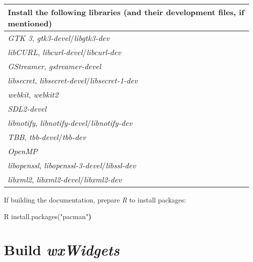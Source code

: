 \documentclass[
  letterpaper,
]{LegrandOrangeBook}
\newenvironment{Shaded}{\begin{snugshade}}{\end{snugshade}}
\newcommand{\ErrorTok}[1]{\textcolor[rgb]{0.68,0.00,0.00}{#1}}
\newcommand{\ExtensionTok}[1]{\textcolor[rgb]{0.00,0.23,0.31}{#1}}
\newcommand{\KeywordTok}[1]{\textcolor[rgb]{0.00,0.23,0.31}{\textbf{#1}}}
\newcommand{\StringTok}[1]{\textcolor[rgb]{0.13,0.47,0.30}{#1}}
\begin{document}
\begin{longtable}[]{@{}
  >{\raggedright\arraybackslash}p{}@{}}
\toprule\noalign{}
\begin{minipage}[b]{\linewidth}\raggedright
Install the following libraries (and their development files, if
mentioned)
\end{minipage} \\
\midrule\noalign{}
\endhead
\bottomrule\noalign{}
\endlastfoot
\emph{GTK 3}, \emph{gtk3-devel}/\emph{libgtk3-dev} \\
\emph{libCURL}, \emph{libcurl-devel}/\emph{libcurl-dev} \\
\emph{GStreamer}, \emph{gstreamer-devel} \\
\emph{libsecret}, \emph{libsecret-devel}/\emph{libsecret-1-dev} \\
\emph{webkit}, \emph{webkit2} \\
\emph{SDL2-devel} \\
\emph{libnotify}, \emph{libnotify-devel}/\emph{libnotify-dev} \\
\emph{TBB}, \emph{tbb-devel}/\emph{tbb-dev} \\
\emph{OpenMP} \\
\emph{libopenssl}, \emph{libopenssl-3-devel}/\emph{libssl-dev} \\
\emph{libxml2}, \emph{libxml2-devel}/\emph{libxml2-dev} \\
\end{longtable}

If building the documentation, prepare \emph{R} to install packages:

\begin{Shaded}
\begin{Highlighting}[]
\ExtensionTok{R}
\ExtensionTok{install.packages}\ErrorTok{(}\StringTok{"pacman"}\KeywordTok{)}
\end{Highlighting}
\end{Shaded}

\newpage{}

\section*{\texorpdfstring{Build
\emph{wxWidgets}}{Build wxWidgets}}\label{build-wxwidgets-2}

\end{document}
